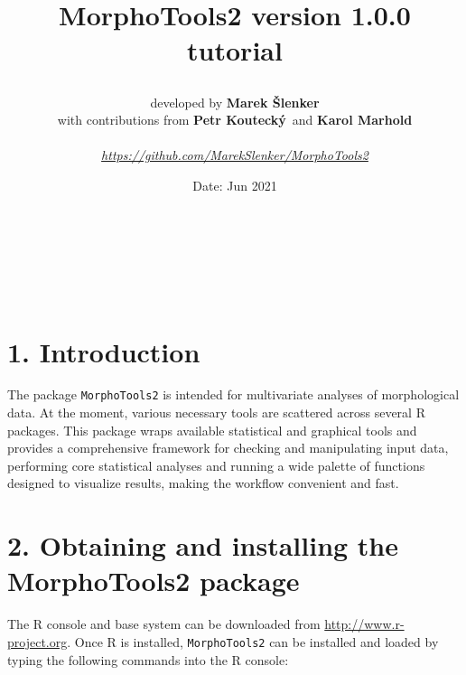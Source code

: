 \documentclass[
  11pt,
  a4paper]{article}
\title{\vspace{+2.0cm}

MorphoTools2 version 1.0.0 tutorial \vspace{+2.0cm}}
\author{developed by \textbf{Marek
Šlenker}\footnotemark[2] \footnotemark[3] \footnotemark[1] \vspace*{0.5pc}\\
with contributions from \textbf{Petr Koutecký}\footnotemark[4] ~and
\textbf{Karol
Marhold}\footnotemark[2] \footnotemark[3] \vspace*{0.7pc}\\
\vspace*{0.7pc}\\
\emph{\url{https://github.com/MarekSlenker/MorphoTools2}}}
\date{Date: Jun 2021}
\begin{document}
\maketitle

~\\
\renewcommand{\thefootnote}{\fnsymbol{footnote}}\\
\\

\newpage

\renewcommand{\baselinestretch}{0.4}
\setcounter{tocdepth}{4}
\tableofcontents
\renewcommand{\baselinestretch}{1.0}\normalsize

\newpage

\hypertarget{introduction}{%
\section{1. Introduction}\label{introduction}}

The package \texttt{MorphoTools2} is intended for multivariate analyses
of morphological data. At the moment, various necessary tools are
scattered across several R packages. This package wraps available
statistical and graphical tools and provides a comprehensive framework
for checking and manipulating input data, performing core statistical
analyses and running a wide palette of functions designed to visualize
results, making the workflow convenient and fast.

\renewcommand{\thefootnote}{\arabic{footnote}}

\hypertarget{obtaining-and-installing-the-morphotools2-package}{%
\section{2. Obtaining and installing the MorphoTools2
package}\label{obtaining-and-installing-the-morphotools2-package}}

The R console and base system can be downloaded from
\url{http://www.r-project.org}. Once R is installed,
\texttt{MorphoTools2} can be installed and loaded by typing the
following commands into the R console:
\end{document}
